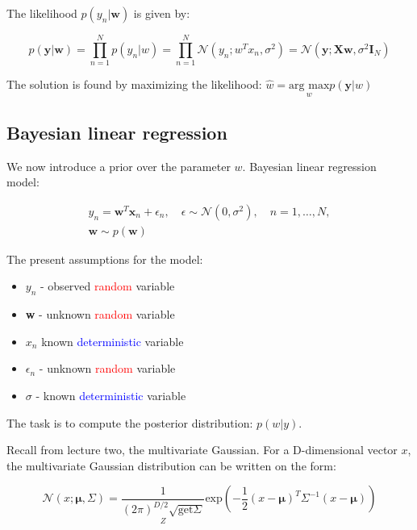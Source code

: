 The likelihood $p(y_n|\bm{w})$ is given by:

\begin{equation}
	p(\bm{y}|\bm{w}) = \prod^N_{n=1} p(y_n|w) =  \prod^N_{n=1} \mathcal{N}(y_n; w^{T}x_n, \sigma ^{2}) = \mathcal{N}(\bm{y}; \bm{Xw}, \sigma ^{2}\bm{I}_N)
\end{equation}

The solution is found by maximizing the likelihood: $\hat{w} = \underset{w}{\text{arg max}} p(\bm{y}|w)$ 

\subsection{Bayesian linear regression}
We now introduce a prior over the parameter $w$. Bayesian linear regression model: 

\begin{wbox}{}
\begin{equation}
\begin{aligned}
	y_n = \bm{w}^{T}\bm{x}_n + \epsilon_n, \quad \epsilon \sim \mathcal{N}(0, \sigma ^{2}), \quad n=1,\ldots, N, \\
	\bm{w} \sim p(\bm{w})
\end{aligned}
\end{equation}
\end{wbox}

The present assumptions for the model:
\begin{itemize}
	\item $y_n$ - observed \textcolor{red}{random} variable
	\item \textbf{w} - unknown \textcolor{red}{random} variable 
	\item $x_n$ known \textcolor{blue}{deterministic} variable
	\item $\epsilon_n$ - unknown \textcolor{red}{random} variable
	\item $\sigma $ - known \textcolor{blue}{deterministic} variable 
\end{itemize}

The task is to compute the posterior distribution: $p(w|y)$.

Recall from lecture two, the multivariate Gaussian. For a D-dimensional vector $x$, the multivariate Gaussian distribution can be written on the form:

\begin{equation}
	\mathcal{N}(x; \bm{\mu}, \Sigma) =\underset{Z}{ \frac{1} {(2 \pi) ^{D/2}\sqrt{\text{get}\Sigma}} } \text{exp} \left( - \frac{1} {2} (x- \bm{\mu })^{T}\Sigma ^{-1}(x- \bm{\mu }) \right)  
\end{equation}


